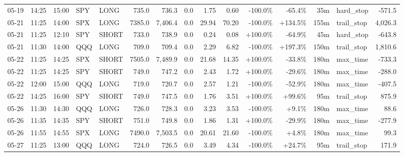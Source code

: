 \documentclass[11pt,a4paper,twoside]{article}
\begin{document}
\begin{landscape}
\begin{center}
\begin{longtable}{>{\color{txtmain}}l l l l l r r r r r r r r >{\color{txtmain}}l r}
05-19 & 14:25 & 15:00 & SPY & LONG & 735.0 & 736.3 & 0.0 & 1.75 & 0.60 & \textcolor{lossred}{-100.0\%} & \textcolor{lossred}{-65.4\%} & 35m & hard\_stop & \textcolor{lossred}{-571.5} \\
05-21 & 11:25 & 14:00 & SPX & LONG & 7385.0 & 7,406.4 & 0.0 & 29.94 & 70.20 & \textcolor{lossred}{-100.0\%} & \textcolor{wingreen}{+134.5\%} & 155m & trail\_stop & \textcolor{wingreen}{4,026.3} \\
05-21 & 11:25 & 12:10 & SPY & SHORT & 733.0 & 738.9 & 0.0 & 0.24 & 0.08 & \textcolor{wingreen}{+100.0\%} & \textcolor{lossred}{-64.9\%} & 45m & hard\_stop & \textcolor{lossred}{-643.8} \\
05-21 & 11:30 & 14:00 & QQQ & LONG & 709.0 & 709.4 & 0.0 & 2.29 & 6.82 & \textcolor{lossred}{-100.0\%} & \textcolor{wingreen}{+197.3\%} & 150m & trail\_stop & \textcolor{wingreen}{1,810.6} \\
05-22 & 11:25 & 14:25 & SPX & SHORT & 7505.0 & 7,489.9 & 0.0 & 21.68 & 14.35 & \textcolor{wingreen}{+100.0\%} & \textcolor{lossred}{-33.8\%} & 180m & max\_time & \textcolor{lossred}{-733.3} \\
05-22 & 11:25 & 14:25 & SPY & SHORT & 749.0 & 747.2 & 0.0 & 2.43 & 1.72 & \textcolor{wingreen}{+100.0\%} & \textcolor{lossred}{-29.6\%} & 180m & max\_time & \textcolor{lossred}{-288.0} \\
05-22 & 12:00 & 15:00 & QQQ & LONG & 719.0 & 720.7 & 0.0 & 2.57 & 1.21 & \textcolor{lossred}{-100.0\%} & \textcolor{lossred}{-52.9\%} & 180m & max\_time & \textcolor{lossred}{-407.5} \\
05-22 & 14:25 & 16:00 & SPY & SHORT & 749.0 & 747.5 & 0.0 & 1.76 & 3.51 & \textcolor{wingreen}{+100.0\%} & \textcolor{wingreen}{+99.6\%} & 95m & trail\_stop & \textcolor{wingreen}{875.9} \\
05-26 & 11:30 & 14:30 & QQQ & LONG & 726.0 & 728.3 & 0.0 & 3.23 & 3.53 & \textcolor{lossred}{-100.0\%} & \textcolor{wingreen}{+9.1\%} & 180m & max\_time & \textcolor{wingreen}{88.6} \\
05-26 & 11:35 & 14:35 & SPY & SHORT & 751.0 & 749.8 & 0.0 & 1.86 & 1.31 & \textcolor{wingreen}{+100.0\%} & \textcolor{lossred}{-29.9\%} & 180m & max\_time & \textcolor{lossred}{-277.9} \\
05-26 & 11:55 & 14:55 & SPX & LONG & 7490.0 & 7,503.5 & 0.0 & 20.61 & 21.60 & \textcolor{lossred}{-100.0\%} & \textcolor{wingreen}{+4.8\%} & 180m & max\_time & \textcolor{wingreen}{99.3} \\
05-27 & 11:25 & 13:00 & QQQ & LONG & 724.0 & 726.5 & 0.0 & 3.49 & 4.34 & \textcolor{lossred}{-100.0\%} & \textcolor{wingreen}{+24.7\%} & 95m & trail\_stop & \textcolor{wingreen}{171.9} \\

\end{longtable}
\end{center}
\end{landscape}
\end{document}
